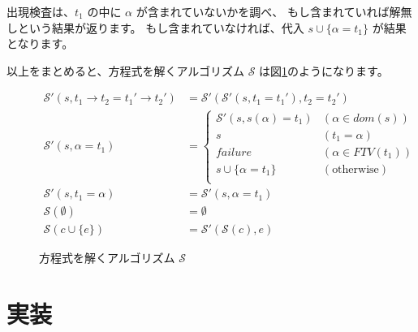 出現検査は、$t_1$ の中に $\alpha$ が含まれていないかを調べ、
もし含まれていれば解無しという結果が返ります。
もし含まれていなければ、代入 $s \cup \{\alpha = t_1\}$ が結果となります。

以上をまとめると、方程式を解くアルゴリズム $\mathcal S$ は図\ref{fig:algorithm-s}のようになります。

\begin{figure}[htbp]
 \begin{align*}
  \mathcal{S'}(s, t_1 \to t_2 = t_1' \to t_2') &=
   \mathcal{S'}(\mathcal{S'}(s, t_1 = t_1'), t_2 = t_2') \\
  \mathcal{S'}(s, \alpha = t_1) &=
   \left \{
    \begin{array}{ll}
     \mathcal{S'}(s, s(\alpha) = t_1) & (\alpha \in \mathit{dom}(s)) \\
     s                                & (t_1 = \alpha) \\
     \textit{failure}                 & (\alpha \in \mathit{FTV}(t_1)) \\
     s \cup \{\alpha = t_1\}          & (\text{otherwise}) \\
    \end{array}
   \right . \\
  \mathcal{S'}(s, t_1 = \alpha) &= \mathcal{S'}(s, \alpha = t_1) \\
  \mathcal{S}(\emptyset) &= \emptyset \\
  \mathcal{S}(c \cup \{e\}) &= \mathcal{S'}(\mathcal{S}(c), e)
 \end{align*}
 \caption{方程式を解くアルゴリズム $\mathcal S$}
 \label{fig:algorithm-s}
\end{figure}



\section{実装}



